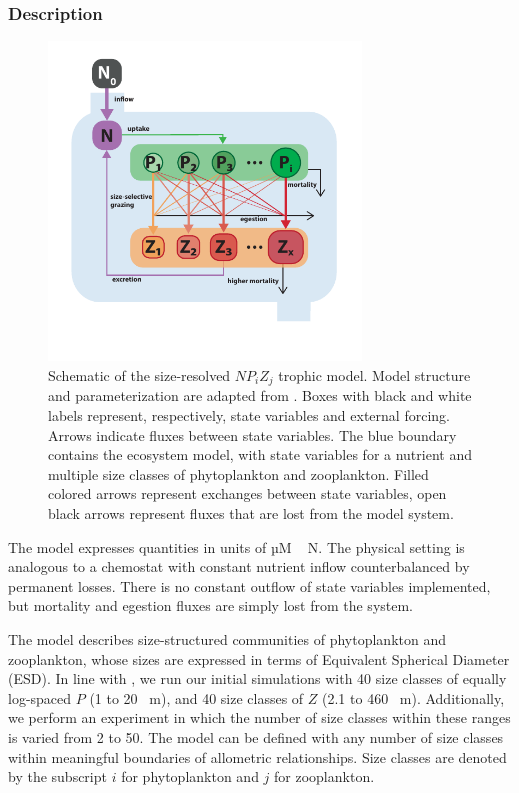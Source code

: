 \documentclass[journal abbreviation, manuscript]{copernicus}
\begin{document}
\subsubsection{Description}
\begin{figure}[t]
\includegraphics[width=8.3cm]{Figures/firstdraft_schematics/03_schematics_ASTroCAT.pdf}
\caption{Schematic of the size-resolved $NP_{i}Z_{j}$ trophic model. Model structure and parameterization are adapted from \citet{Banas2011b}. 
Boxes with black and white labels represent, respectively, state variables and external forcing. Arrows indicate fluxes between state variables. The blue boundary contains the ecosystem model, with state variables for a nutrient and multiple size classes of phytoplankton and zooplankton. Filled colored arrows represent exchanges between state variables, open black arrows represent fluxes that are lost from the model system.}
\label{Figure:ModelSchematics_3}
\end{figure}

The model expresses quantities in units of \unit{µM\,N}. The physical setting is analogous to a chemostat with constant nutrient inflow counterbalanced by permanent losses. There is no constant outflow of state variables implemented, but mortality and egestion fluxes are simply lost from the system. 

The model describes size-structured communities of phytoplankton and zooplankton, whose sizes are expressed in terms of Equivalent Spherical Diameter (ESD). In line with \citet{Banas2011b}, we run our initial simulations with 40 size classes of equally log-spaced $P$ (1 to 20 \unit{\mu m}), and 40 size classes of $Z$ (2.1 to 460  \unit{\mu m}). Additionally, we perform an experiment in which the number of size classes within these ranges is varied from 2 to 50. The model can be defined with any number of size classes within meaningful boundaries of allometric relationships. Size classes are denoted by the subscript $i$ for phytoplankton and $j$ for zooplankton.
\end{document}
